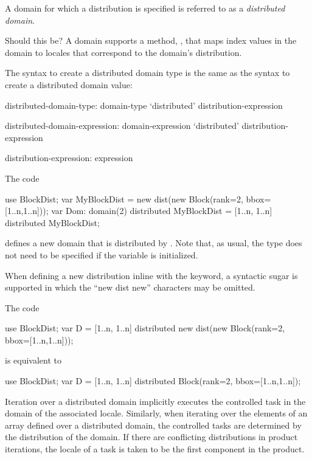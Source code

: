 A domain for which a distribution is specified is referred to as a
{\em distributed domain}.

\begin{rationale}
Should this be? A domain supports a method, , that maps
index values in the domain to locales that correspond to the domain's
distribution.
\end{rationale}

The syntax to create a distributed domain type is the same as the
syntax to create a distributed domain value:
\begin{syntax}
distributed-domain-type:
  domain-type `distributed' distribution-expression

distributed-domain-expression:
  domain-expression `distributed' distribution-expression

distribution-expression:
  expression
\end{syntax}

\begin{example}
The code
\begin{chapel}
use BlockDist;
var MyBlockDist = new dist(new Block(rank=2, bbox=[1..n,1..n]));
var Dom: domain(2) distributed MyBlockDist =
           [1..n, 1..n] distributed MyBlockDist;
\end{chapel}
defines a new domain that is distributed by .  Note
that, as usual, the type does not need to be specified if the variable
is initialized.
\end{example}

When defining a new distribution inline with the 
keyword, a syntactic sugar is supported in which the ``new dist new''
characters may be omitted.
\begin{example}
The code
\begin{chapel}
use BlockDist;
var D = [1..n, 1..n] distributed new dist(new Block(rank=2, bbox=[1..n,1..n]));
\end{chapel}
is equivalent to
\begin{chapel}
use BlockDist;
var D = [1..n, 1..n] distributed Block(rank=2, bbox=[1..n,1..n]);
\end{chapel}
\end{example}

Iteration over a distributed domain implicitly executes the controlled
task in the domain of the associated locale.  Similarly, when
iterating over the elements of an array defined over a distributed
domain, the controlled tasks are determined by the distribution of the
domain.  If there are conflicting distributions in product iterations,
the locale of a task is taken to be the first component in the
product.

